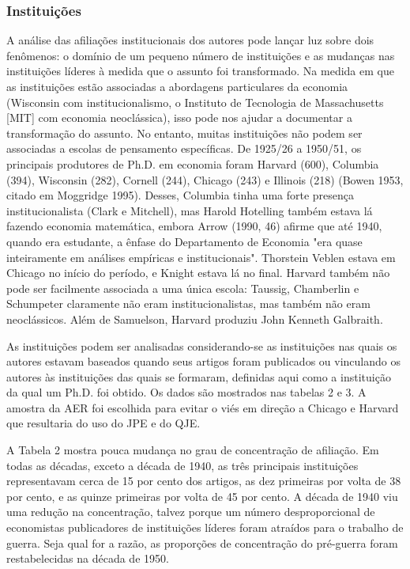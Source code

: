 \documentclass[12pt]{article}
\begin{document}
\subsubsection{\textbf{Instituições}}
A análise das afiliações institucionais dos autores pode lançar luz sobre dois fenômenos: o domínio de um pequeno número de instituições e as mudanças nas instituições líderes à medida que o assunto foi transformado. Na medida em que as instituições estão associadas a abordagens particulares da economia (Wisconsin com institucionalismo, o Instituto de Tecnologia de Massachusetts [MIT] com economia neoclássica), isso pode nos ajudar a documentar a transformação do assunto. No entanto, muitas instituições não podem ser associadas a escolas de pensamento específicas. De 1925/26 a 1950/51, os principais produtores de Ph.D. em economia foram Harvard (600), Columbia (394), Wisconsin (282), Cornell (244), Chicago (243) e Illinois (218) (Bowen 1953, citado em Moggridge 1995). Desses, Columbia tinha uma forte presença institucionalista (Clark e Mitchell), mas Harold Hotelling também estava lá fazendo economia matemática, embora Arrow (1990, 46) afirme que até 1940, quando era estudante, a ênfase do Departamento de Economia "era quase inteiramente em análises empíricas e institucionais". Thorstein Veblen estava em Chicago no início do período, e Knight estava lá no final. Harvard também não pode ser facilmente associada a uma única escola: Taussig, Chamberlin e Schumpeter claramente não eram institucionalistas, mas também não eram neoclássicos. Além de Samuelson, Harvard produziu John Kenneth Galbraith.

As instituições podem ser analisadas considerando-se as instituições nas quais os autores estavam baseados quando seus artigos foram publicados ou vinculando os autores às instituições das quais se formaram, definidas aqui como a instituição da qual um Ph.D. foi obtido. Os dados são mostrados nas tabelas 2 e 3. A amostra da AER foi escolhida para evitar o viés em direção a Chicago e Harvard que resultaria do uso do JPE e do QJE.

A Tabela 2 mostra pouca mudança no grau de concentração de afiliação. Em todas as décadas, exceto a década de 1940, as três principais instituições representavam cerca de 15 por cento dos artigos, as dez primeiras por volta de 38 por cento, e as quinze primeiras por volta de 45 por cento. A década de 1940 viu uma redução na concentração, talvez porque um número desproporcional de economistas publicadores de instituições líderes foram atraídos para o trabalho de guerra. Seja qual for a razão, as proporções de concentração do pré-guerra foram restabelecidas na década de 1950.
\end{document}
